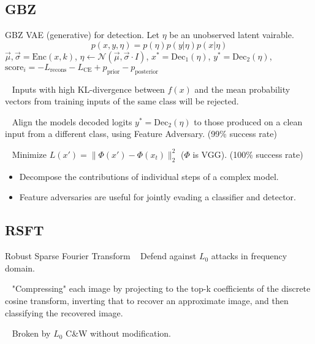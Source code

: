 \documentclass[12,times]{beamer}
\begin{document}
\subsection{GBZ}
\begin{frame}{GBZ}
	VAE (generative) for detection. Let $\eta$ be an unobserved latent vairable.
	$$ p(x,y,\eta) = p(\eta)p(y|\eta)p(x|\eta) $$
	$\vec{\mu},\vec{\sigma} = \text{Enc}(x,k)$,
	$\eta \leftarrow \mathcal{N}(\vec{\mu}, \vec{\sigma}\cdot I)$,
	$x^\ast = \text{Dec}_1(\eta)$,
	$y^\ast = \text{Dec}_2(\eta)$,
	$\text{score}_i = -L_\text{recons} - L_\text{CE} + p_\text{prior}
	 - p_\text{posterior} $
	 
	 \textbullet~ Inputs with high KL-divergence between $f(x)$ and the mean probability
	 vectors from training inputs of the same class will be rejected.
\end{frame}

\begin{frame}
	\textbullet~ Align the models decoded logits $y^\ast = \text{Dec}_2(\eta)$
	to those produced on a clean input from a different class, using Feature Adversary. (99\% success rate)
	
	\textbullet~ Minimize $L(x') = \|\Phi(x') - \Phi(x_t)\|_2^2 $ ($\Phi$ is VGG). (100\% success rate)
	
	\begin{itemize}
		\item Decompose the contributions of individual steps of a complex model.
		\item Feature adversaries are useful for jointly evading a 
		classifier and detector.
	\end{itemize}
\end{frame}

\subsection{RSFT}
\begin{frame}{Robust Sparse Fourier Transform}
	\textbullet~ Defend against $L_0$ attacks in frequency domain.
	
	\textbullet~ "Compressing" each image by projecting to the
	top-k coefficients of the discrete cosine transform, inverting that to recover an approximate image, and then classifying the recovered image.
	
	\textbullet~ Broken by $L_0$ C\&W without modification.
\end{frame}
\end{document}
